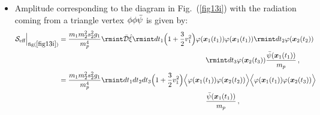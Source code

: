 \begin{itemize}
\begin{align}
\begin{split}
       =\frac{m_1m_2s_1s_2}{m_p^2}\rmint dt_1 dt_2 \Big(\frac{1}{m_p}+\frac{3v_1^2}{2m_p}\Big) \Big{\langle}\varphi(\boldsymbol{x}_1(t_1)) \varphi(\boldsymbol{x}_2(t_2))\Big{\rangle}{\Bar{\psi}(\boldsymbol{x}_1(t_1))}\,,\\&
       =\frac{m_1m_2s_1s_2}{m_p^2} \rmint dt_1 dt_2 \Big(\frac{1}{m_p}+\frac{3v_1^2}{2m_p}\Big)\delta(t_1-t_2)\rmint \frac{d^3k}{(2\pi)^3}\frac{e^{i\boldsymbol{k}\cdot\boldsymbol{r}}}{\boldsymbol{k}^2+m^2}{\Bar{\psi}(\boldsymbol{x}_1(t_1))}\,,\\ &
       =\frac{m_1m_2s_1s_2}{m_p^2} \rmint dt \Big(1+\frac{3v_1^2}{2}\Big) \frac{1}{4\pi r}e^{-mr}\frac{\Bar{\psi}(\boldsymbol{x}_1(t))}{m_p}+(1\leftrightarrow 2)\,,\\&\sim \mathcal{O}(L^{1/2}v^{5/2})+\mathcal{O}(L^{1/2}v^{9/2})\,.
    \end{split}
\end{align}
Note that, a part of it contributes at $N^{(2)}LO$ and the other part at $N^{(4)}LO.$ 
 \item Amplitude corresponding to the diagram in Fig.~(\ref{fig13i})  with the radiation coming from a triangle vertex $\phi\phi\Bar{\psi}$  is given by: 
\begin{align}
    \begin{split}
         \mathcal{S}_{\text{eff}}\Big |_{\text{fig}(\ref{fig13i})}&=\frac{m_1m_2^2s_2^2g_1}{m_p^4}\rmint \Bar{\mathcal{D}}\hat{\xi}\rmint dt_1\Big(1+\frac{3}{2}v_1^2\Big)\varphi(\boldsymbol{x}_1(t_1))\varphi(\boldsymbol{x}_1(t_1))\rmint dt_2 \varphi(\boldsymbol{x}_2(t_2)) \,\, \\& \,\,\,\,\,\,\,\,\,\,\,\,\,\,\,\,\,\,\,\,\,\,\,\,\,\,\,\,\,\,\,\,\,\,\,\,\,\,\,\,\,\,\,\,\,\,\,\,\,\,\,\,\,\,\,\,\,\,\,\,\,\,\,\,\,\,\,\,\,\,\,\,\,\,\,\,\,\,\,\,\,\,\,\,\,\,\,\,\,\,\,\,\,\,\,\,\,\,\,\,\,\,\,\,\,\,\,\,\,\,\,\,\,\,\,\,\,\,\,\,\,\,\,\,\,\,\rmint dt_3\varphi(\boldsymbol{x}_2(t_3)) \frac{\Bar{\psi}(\boldsymbol{x}_1(t_1))}{m_p}\,,\\&
         =\frac{m_1m_2^2s_2^2g_1}{m_p^4}\rmint dt_1 dt_2 dt_3\Big(1+\frac{3}{2}v_1^2\Big)\Big{\langle}\varphi(\boldsymbol{x}_1(t_1)) \varphi(\boldsymbol{x}_2(t_2))\Big{\rangle}\Big{\langle}\varphi(\boldsymbol{x}_1(t_1)) \varphi(\boldsymbol{x}_2(t_3))\Big{\rangle}\\& \,\,\,\,\,\,\,\,\,\,\,\,\,\,\,\,\,\,\,\,\,\,\,\,\,\,\,\,\,\,\,\,\,\,\,\,\,\,\,\,\,\,\,\,\,\,\,\,\,\,\,\,\,\,\,\,\,\,\,\,\,\,\,\,\,\,\,\,\,\,\,\,\,\,\,\,\,\,\,\,\,\,\,\,\,\,\,\,\,\,\,\,\,\,\,\,\,\,\,\,\,\,\,\,\,\,\,\,\,\,\,\,\,\,\,\,\,\,\,\,\,\,\,\,\,\, \frac{\Bar{\psi}(\boldsymbol{x}_1(t_1))}{m_p}\,,\\&

\end{split}
\end{align}
\end{itemize}
